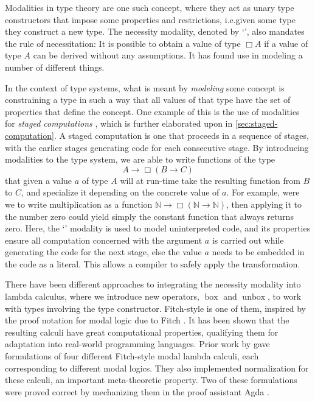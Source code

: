 \documentclass[12pt,twoside,openright]{report}
\numberwithin{equation}{chapter}
\numberwithin{figure}{chapter}
\numberwithin{table}{chapter}
\theoremstyle{definition}\newtheorem{definition}{Definition}
\begin{document}
Modalities in type theory are one such concept,
where they act as unary type constructors
that impose some properties and restrictions,
i.e.\@ given some type they construct a new type.
The necessity modality, denoted by `\Box',
also mandates the rule of necessitation:
It is possible to obtain a value of type $\Box A$
if a value of type $A$ can be derived without any assumptions.
It has found use in modeling a number of different things.

In the context of type systems, what is meant by \emph{modeling} some concept
is constraining a type in such a way that all values of that type
have the set of properties that define the concept.
One example of this is the use of modalities for \emph{staged computations} \cite{davies01},
which is further elaborated upon in \autoref{sec:staged-computation}.
A staged computation is one that proceeds in a sequence of stages,
with the earlier stages generating code for each consecutive stage.
By introducing modalities to the type system,
we are able to write functions of the type
$$ A \to \Box (B \to C) $$
that given a value $a$ of type $A$ will at run-time take the resulting function from $B$ to $C$,
and specialize it depending on the concrete value of $a$.
For example, were we to write multiplication as a function
$\mathbb N \to \Box (\mathbb N \to \mathbb N)$,
then applying it to the number zero could yield simply
the constant function that always returns zero.
Here, the `\Box' modality is used to model uninterpreted code,
and its properties ensure all computation concerned with the argument $a$
is carried out while generating the code for the next stage,
else the value $a$ needs to be embedded in the code as a literal.
This allows a compiler to safely apply the transformation.

There have been different approaches to integrating the necessity modality into lambda calculus,
where we introduce new operators, $\operatorname{box}$ and $\operatorname{unbox}$,
to work with types involving the \Box{} type constructor.
Fitch-style is one of them,
inspired by the proof notation for modal logic due to Fitch \cite{borghuis94}.
It has been shown that the resulting calculi have great computational properties,
qualifying them for adaptation into real-world programming languages.
Prior work by \textcite{valliappan22} gave formulations
of four different Fitch-style modal lambda calculi,
each corresponding to different modal logics.
They also implemented normalization for these calculi,
an important meta-theoretic property.
Two of these formulations were proved correct
by mechanizing them in the proof assistant Agda \cite{norell07}.
\end{document}

